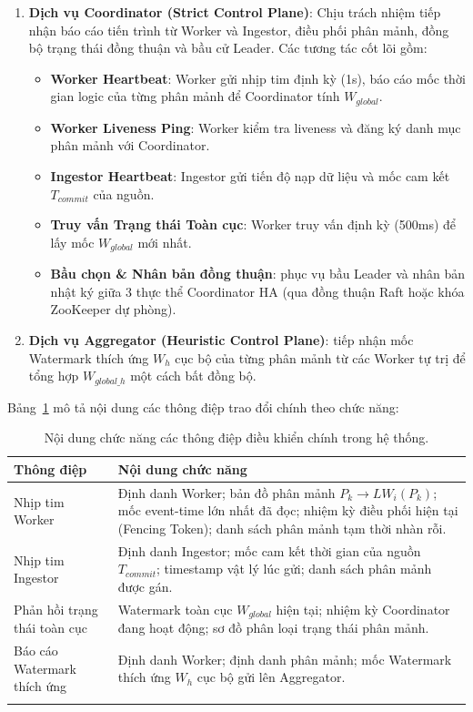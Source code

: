 \documentclass[12pt,a4paper]{article}
\begin{document}
\begin{enumerate}
    \item \textbf{Dịch vụ Coordinator (Strict Control Plane)}: Chịu trách nhiệm tiếp nhận báo cáo tiến trình từ Worker và Ingestor, điều phối phân mảnh, đồng bộ trạng thái đồng thuận và bầu cử Leader. Các tương tác cốt lõi gồm:
    \begin{itemize}
        \item \textbf{Worker Heartbeat}: Worker gửi nhịp tim định kỳ (1s), báo cáo mốc thời gian logic của từng phân mảnh để Coordinator tính $W_{global}$.
        \item \textbf{Worker Liveness Ping}: Worker kiểm tra liveness và đăng ký danh mục phân mảnh với Coordinator.
        \item \textbf{Ingestor Heartbeat}: Ingestor gửi tiến độ nạp dữ liệu và mốc cam kết $T_{commit}$ của nguồn.
        \item \textbf{Truy vấn Trạng thái Toàn cục}: Worker truy vấn định kỳ (500ms) để lấy mốc $W_{global}$ mới nhất.
        \item \textbf{Bầu chọn \& Nhân bản đồng thuận}: phục vụ bầu Leader và nhân bản nhật ký giữa 3 thực thể Coordinator HA (qua đồng thuận Raft hoặc khóa ZooKeeper dự phòng).
    \end{itemize}

    \item \textbf{Dịch vụ Aggregator (Heuristic Control Plane)}: tiếp nhận mốc Watermark thích ứng $W_h$ cục bộ của từng phân mảnh từ các Worker tự trị để tổng hợp $W_{global\_h}$ một cách bất đồng bộ.
\end{enumerate}

Bảng~\ref{tab:grpc_messages} mô tả nội dung các thông điệp trao đổi chính theo chức năng:

\begin{longtable}{p{} p{}}
\toprule
\textbf{Thông điệp} & \textbf{Nội dung chức năng} \\
\midrule
\endhead
Nhịp tim Worker & Định danh Worker; bản đồ phân mảnh $P_k \to LW_i(P_k)$; mốc event-time lớn nhất đã đọc; nhiệm kỳ điều phối hiện tại (Fencing Token); danh sách phân mảnh tạm thời nhàn rỗi. \\
\midrule
Nhịp tim Ingestor & Định danh Ingestor; mốc cam kết thời gian của nguồn $T_{commit}$; timestamp vật lý lúc gửi; danh sách phân mảnh được gán. \\
\midrule
Phản hồi trạng thái toàn cục & Watermark toàn cục $W_{global}$ hiện tại; nhiệm kỳ Coordinator đang hoạt động; sơ đồ phân loại trạng thái phân mảnh. \\
\midrule
Báo cáo Watermark thích ứng & Định danh Worker; định danh phân mảnh; mốc Watermark thích ứng $W_h$ cục bộ gửi lên Aggregator. \\
\bottomrule
\caption{Nội dung chức năng các thông điệp điều khiển chính trong hệ thống.}
\label{tab:grpc_messages}
\end{longtable}
\end{document}

